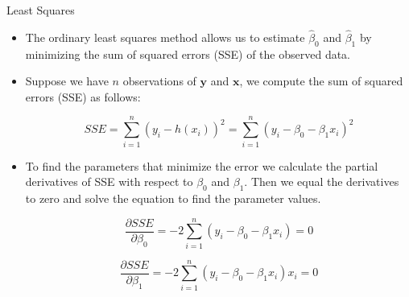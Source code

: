 \documentclass[handout]{beamer}
\begin{document}
\begin{frame}{Least Squares}
\scriptsize{
\begin{itemize}

 \item The ordinary least squares method allows us to estimate  $\hat{\beta}_{0}$ and $\hat{\beta}_{1}$ by minimizing the sum of squared errors (SSE) of the observed data.

 \item Suppose we have $n$ observations of $\mathbf{y}$ and $\mathbf{x}$, we compute the sum of squared errors (SSE) as follows:

\begin{equation}
SSE = \sum_{i=1}^{n} (y_i-h(x_i))^2 =  \sum_{i=1}^{n} (y_i-\beta_{0}-\beta_{1}x_i)^2
\end{equation}

 \item To find the parameters that minimize the error we calculate the partial derivatives of SSE with respect to $\beta_{0}$ and $\beta_{1}$. Then we equal the derivatives to zero and solve the equation to find the parameter values.
 
 \begin{equation}
 \frac{\partial SSE}{ \partial \beta_0} = -2\sum_{i=1}^{n}(y_i-\beta_{0}-\beta_{1}x_i)=0
 \end{equation}

  \begin{equation}
 \frac{\partial SSE}{ \partial \beta_1} = -2\sum_{i=1}^{n}(y_i-\beta_{0}-\beta_{1}x_i)x_i=0
 \end{equation}



\end{itemize}



} 
\end{frame}
\end{document}
